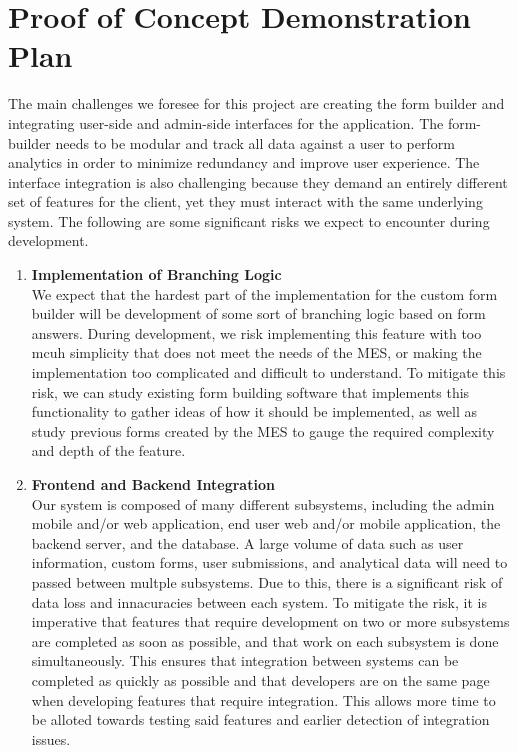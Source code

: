 \documentclass{article}
\begin{document}
\section{Proof of Concept Demonstration Plan}
\begin{flushleft}
  
The main challenges we foresee for this project are creating the form builder
and integrating user-side and admin-side interfaces for the application. The
form-builder needs to be modular and track all data against a user to perform
analytics in order to minimize redundancy and improve user experience. The
interface integration is also challenging because they demand an entirely
different set of features for the client, yet they must interact with the same
underlying system.
  \newline
  \newline
The following are some significant risks we expect to encounter during development.
\begin{enumerate}
  \item \textbf{Implementation of Branching Logic} \\
  We expect that the hardest part of the implementation for the custom form builder will be development of some sort of branching logic based on form answers. During development, we risk implementing this feature with too mcuh simplicity that does not meet the needs of the MES, or making the implementation too complicated and difficult to understand.
  \newline
  \newline
  To mitigate this risk, we can study existing form building software that implements this functionality to gather ideas of how it should be implemented, as well as study previous forms created by the MES to gauge the required complexity and depth of the feature.
  \item \textbf{Frontend and Backend Integration} \\
  Our system is composed of many different subsystems, including the admin mobile and/or web application, end user web and/or mobile application, the backend server, and the database. A large volume of data such as user information, custom forms, user submissions, and analytical data will need to passed between multple subsystems. Due to this, there is a significant risk of data loss and innacuracies between each system.
  \newline
  \newline
  To mitigate the risk, it is imperative that features that require development on two or more subsystems are completed as soon as possible, and that work on each subsystem is done simultaneously. This ensures that integration between systems can be completed as quickly as possible and that developers are on the same page when developing features that require integration. This allows more time to be alloted towards testing said features and earlier detection of integration issues.

\end{enumerate}
\end{flushleft}
\end{document}
